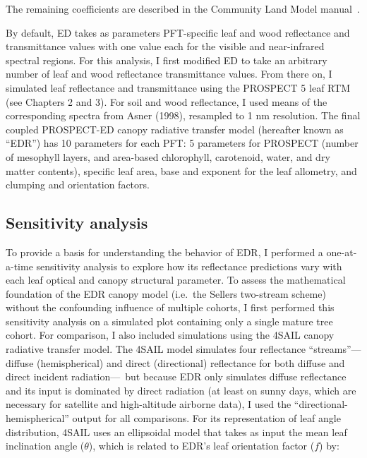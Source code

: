 The remaining coefficients are described in the Community Land Model manual~\cite{clm45_note}.

By default, ED takes as parameters PFT-specific leaf and wood reflectance and transmittance values with one value each for the visible and near-infrared spectral regions. 
For this analysis, I first modified ED to take an arbitrary number of leaf and wood reflectance transmittance values.
From there on, I simulated leaf reflectance and transmittance using the PROSPECT 5 leaf RTM (see Chapters 2 and 3).
For soil and wood reflectance, I used means of the corresponding spectra from Asner (1998), resampled to 1 nm resolution. \nocite{asner_1998_biophysical}
The final coupled PROSPECT-ED canopy radiative transfer model (hereafter known as ``EDR'') has 10 parameters for each PFT\@:
5 parameters for PROSPECT (number of mesophyll layers, and area-based chlorophyll, carotenoid, water, and dry matter contents),
specific leaf area,
base and exponent for the leaf allometry,
and clumping and orientation factors.

\subsection{Sensitivity analysis}

To provide a basis for understanding the behavior of EDR, I performed a one-at-a-time sensitivity analysis to explore how its reflectance predictions vary with each leaf optical and canopy structural parameter.
To assess the mathematical foundation of the EDR canopy model (i.e.\ the Sellers two-stream scheme) without the confounding influence of multiple cohorts, I first performed this sensitivity analysis on a simulated plot containing only a single mature tree cohort.
For comparison, I also included simulations using the 4SAIL canopy radiative transfer model.
The 4SAIL model simulates four reflectance ``streams''---diffuse (hemispherical) and direct (directional) reflectance for both diffuse and direct incident radiation---\
but because EDR only simulates diffuse reflectance and its input is dominated by direct radiation (at least on sunny days, which are necessary for satellite and high-altitude airborne data), I used the ``directional-hemispherical'' output for all comparisons.
For its representation of leaf angle distribution, 4SAIL uses an ellipsoidal model that takes as input the mean leaf inclination angle ($\theta$), which is related to EDR's leaf orientation factor ($f$) by:

